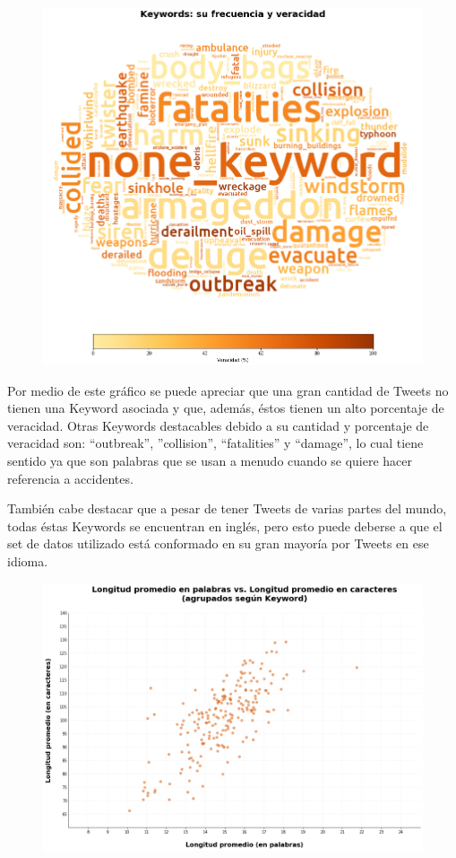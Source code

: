 \documentclass[titlepage,a4paper]{article}
\begin{document}
    \begin{figure}[H]
    \centering
    \includegraphics[width=1\textwidth]{graficos/Analisis de Keyword/keywords_frec_y_veracidad.png}
    \caption{} 
    \end{figure}
    
    Por medio de este gráfico se puede apreciar que una gran cantidad de Tweets no tienen una Keyword asociada y que, además, éstos tienen un alto porcentaje de veracidad. Otras Keywords destacables debido a su cantidad y porcentaje de veracidad son: ``outbreak'', ''collision'', ``fatalities'' y ``damage'', lo cual tiene sentido ya que son palabras que se usan a menudo cuando se quiere hacer referencia a accidentes. 
    
    También cabe destacar que a pesar de tener Tweets de varias partes del mundo, todas éstas Keywords se encuentran en inglés, pero esto puede deberse a que el set de datos utilizado está conformado en su gran mayoría por Tweets en ese idioma.
    
    \begin{figure}[H]
    \centering
    \includegraphics[width=1\textwidth]{graficos/Analisis de Keyword/long_prom_en_palabras_vs_long_prom_en_Caracteres.png}
    \caption{} 
    \end{figure}
    
\end{document}

